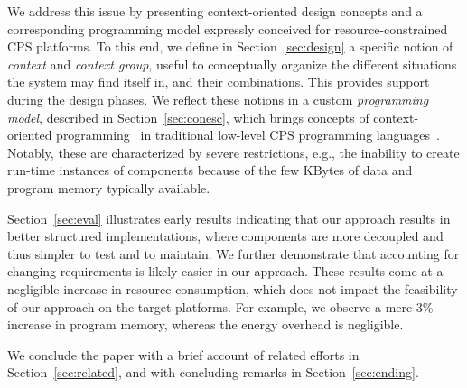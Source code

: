 We address this issue by presenting context-oriented design concepts
and a corresponding programming model expressly conceived for
resource-constrained CPS platforms. To this end, we define in
Section~\ref{sec:design} a specific notion of \emph{context} and
\emph{context group}, useful to conceptually organize the different
situations the system may find itself in, and their combinations. This
provides support during the design phases. We reflect these notions in
a custom \emph{programming model}, described in
Section~\ref{sec:conesc}, which brings concepts of context-oriented
programming~\cite{Hirschfeld08} in traditional low-level CPS
programming languages~\cite{gay03nesc}. Notably, these are
characterized by severe restrictions, e.g., the inability to create
run-time instances of components because of the few KBytes of data and
program memory typically available.

Section~\ref{sec:eval} illustrates early results indicating that our
approach results in better structured implementations, where
components are more decoupled and thus simpler to test and to
maintain. We further demonstrate that accounting for changing
requirements is likely easier in our approach. These results come at a
negligible increase in resource consumption, which does not impact the
feasibility of our approach on the target platforms. For example, we
observe a mere 3\% increase in program memory, whereas the energy
overhead is negligible.

We conclude the paper with a brief account of related efforts in
Section~\ref{sec:related}, and with concluding remarks in
Section~\ref{sec:ending}.







